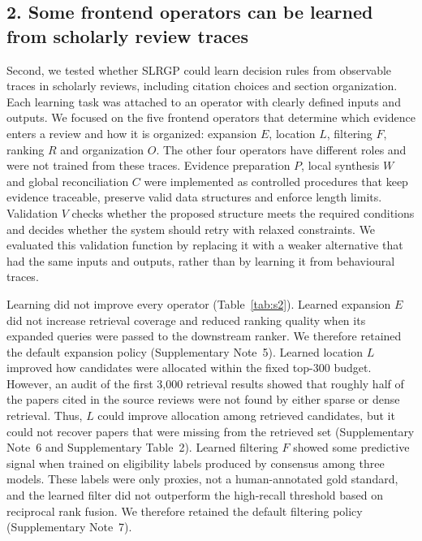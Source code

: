 \documentclass[11pt,a4paper]{article}
\begin{document}
\subsection*{2. Some frontend operators can be learned from scholarly review traces}

Second, we tested whether SLRGP could learn decision rules from observable traces in scholarly reviews, including citation choices and section organization. Each learning task was attached to an operator with clearly defined inputs and outputs. We focused on the five frontend operators that determine which evidence enters a review and how it is organized: expansion $E$, location $L$, filtering $F$, ranking $R$ and organization $O$. The other four operators have different roles and were not trained from these traces. Evidence preparation $P$, local synthesis $W$ and global reconciliation $C$ were implemented as controlled procedures that keep evidence traceable, preserve valid data structures and enforce length limits. Validation $V$ checks whether the proposed structure meets the required conditions and decides whether the system should retry with relaxed constraints. We evaluated this validation function by replacing it with a weaker alternative that had the same inputs and outputs, rather than by learning it from behavioural traces.

Learning did not improve every operator (Table~\ref{tab:s2}). Learned expansion $E$ did not increase retrieval coverage and reduced ranking quality when its expanded queries were passed to the downstream ranker. We therefore retained the default expansion policy (Supplementary Note~5). Learned location $L$ improved how candidates were allocated within the fixed top-300 budget. However, an audit of the first 3,000 retrieval results showed that roughly half of the papers cited in the source reviews were not found by either sparse or dense retrieval. Thus, $L$ could improve allocation among retrieved candidates, but it could not recover papers that were missing from the retrieved set (Supplementary Note~6 and Supplementary Table~2). Learned filtering $F$ showed some predictive signal when trained on eligibility labels produced by consensus among three models. These labels were only proxies, not a human-annotated gold standard, and the learned filter did not outperform the high-recall threshold based on reciprocal rank fusion\cite{rrf}. We therefore retained the default filtering policy (Supplementary Note~7).
\end{document}
